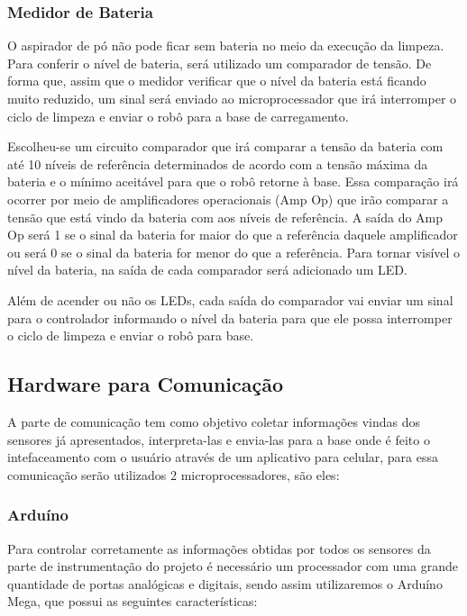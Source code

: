   \subsubsection{Medidor de Bateria}
  \label{sub:Medidor_de_bateria}
    O aspirador de pó não pode ficar sem bateria no meio da execução da limpeza. Para conferir o nível de bateria, será utilizado um comparador de tensão. De forma que, assim que o medidor verificar que o nível da bateria está ficando muito reduzido, um sinal será enviado ao microprocessador que irá interromper o ciclo de limpeza e enviar o robô para a base de carregamento.

    Escolheu-se um circuito comparador que irá comparar a tensão da bateria com até 10 níveis de referência determinados de acordo com a tensão máxima da bateria e o mínimo aceitável para que o robô retorne à base. Essa comparação irá ocorrer por meio de amplificadores operacionais (Amp Op) que irão comparar a tensão que está vindo da bateria com aos níveis de referência. A saída do Amp Op será 1 se o sinal da bateria for maior do que a referência daquele amplificador ou será 0 se o sinal da bateria for menor do que a referência. Para tornar visível o nível da bateria, na saída de cada comparador será adicionado um LED.

    Além de acender ou não os LEDs, cada saída do comparador vai enviar um sinal para o controlador informando o nível da bateria para que ele possa interromper o ciclo de limpeza e enviar o robô para base.


\subsection{Hardware para Comunicação}
\label{sub:Hardwar_para_Comunicação}
  A parte de comunicação tem como objetivo coletar informações vindas dos sensores já apresentados, interpreta-las e envia-las para a base onde é feito o intefaceamento com o usuário através de um aplicativo para celular, para essa comunicação serão utilizados 2 microprocessadores, são eles:

    \subsubsection{Arduíno}
    Para controlar corretamente as informações obtidas por todos os sensores da parte de instrumentação do projeto é necessário um processador com uma grande quantidade de portas analógicas e digitais, sendo assim utilizaremos o Arduíno Mega, que possui as seguintes características:

